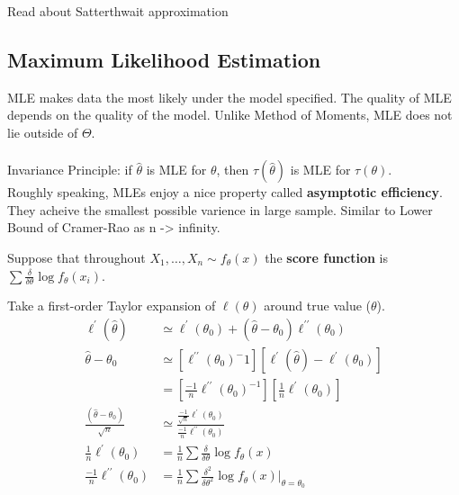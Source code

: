 \documentclass[11pt,fleqn]{book} %
\begin{document}
	\begin{remark}
		Read about Satterthwait approximation
	\end{remark}

\subsection{Maximum Likelihood Estimation}

	MLE makes data the most likely under the model specified. The quality of MLE depends on the quality of the model. Unlike Method of Moments, MLE does not lie outside of $\Theta$. \\
	\\
	Invariance Principle: if $\hat{\theta}$ is MLE for $\theta$, then $\tau(\hat{\theta})$ is MLE for $\tau(\theta)$. \\

	Roughly speaking, MLEs enjoy a nice property called \textbf{asymptotic efficiency}. They acheive the smallest possible varience in large sample. Similar to Lower Bound of Cramer-Rao as n -> infinity. 

	\begin{definition}
		Suppose that throughout $X_1,\dots,X_n \sim f_\theta(x)$ the \textbf{score function} is $\sum \frac{\delta}{\delta \theta} \log f_\theta(x_i)$. 
	\end{definition}

	Take a first-order Taylor expansion of $\ell(\theta)$ around true value ($\theta$). 
	\begin{align*}
	\ell^\prime(\hat{\theta})&\simeq \ell^\prime(\theta_0) + (\hat{\theta}-\theta_0)\ell^{\prime\prime}(\theta_0)\\
	\hat{\theta}-\theta_0&\simeq [\ell^{\prime\prime}(\theta_0)^-1][\ell^\prime(\hat{\theta})-\ell^\prime(\theta_0)]\\
		&=[\frac{-1}{n}\ell^{\prime\prime}(\theta_0)^{-1}][\frac{1}{n}\ell^\prime(\theta_0)]\\
	\frac{(\hat{\theta}-\theta_0)}{\sqrt{n}}&\simeq \frac{\frac{-1}{\sqrt{n}}\ell^\prime(\theta_0)}{\frac{-1}{n}\ell^{\prime\prime}(\theta_0)}\\
	\frac{1}{n}\ell^\prime(\theta_0)&= \frac{1}{n}\sum \frac{\delta}{\delta\theta}\log f_\theta(x)\\
	\frac{-1}{n}\ell^{\prime\prime}(\theta_0)&= \frac{1}{n}\sum \frac{\delta^2}{\delta\theta^2}\log f_\theta(x)|_{\theta=\theta_0}\\
	\end{align*}
\end{document}
